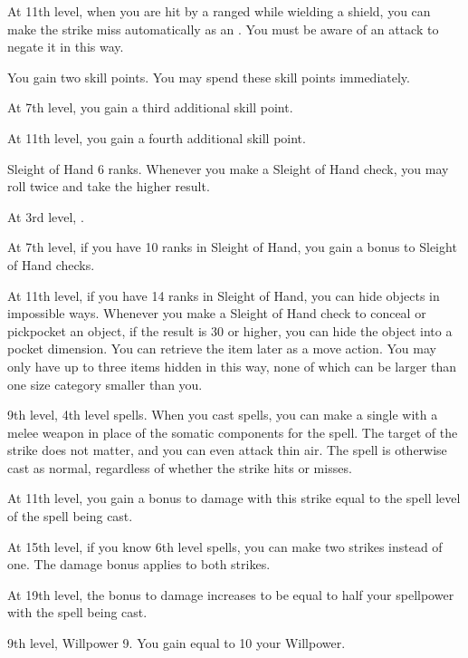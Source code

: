     At 11th level, when you are hit by a ranged  while wielding a shield, you can make the strike miss automatically as an .
    You must be aware of an attack to negate it in this way.

    \featben You gain two skill points.
    You may spend these skill points immediately.

    At 7th level, you gain a third additional skill point.

    At 11th level, you gain a fourth additional skill point.

    \featpre Sleight of Hand 6 ranks.
    \featben Whenever you make a Sleight of Hand check, you may roll twice and take the higher result.

    At 3rd level, \tdash.

    At 7th level, if you have 10 ranks in Sleight of Hand, you gain a  bonus to Sleight of Hand checks.

    At 11th level, if you have 14 ranks in Sleight of Hand, you can hide objects in impossible ways.
    Whenever you make a Sleight of Hand check to conceal or pickpocket an object, if the result is 30 or higher, you can hide the object into a pocket dimension.
    You can retrieve the item later as a move action.
    You may only have up to three items hidden in this way, none of which can be larger than one size category smaller than you.
    \magical

    \featpres 9th level, 4th level spells.
    \featben When you cast spells, you can make a single  with a melee weapon in place of the somatic components for the spell.
    The target of the strike does not matter, and you can even attack thin air.
    The spell is otherwise cast as normal, regardless of whether the strike hits or misses.

    At 11th level, you gain a bonus to damage with this strike equal to the spell level of the spell being cast.

    At 15th level, if you know 6th level spells, you can make two strikes instead of one.
    The damage bonus applies to both strikes.

    At 19th level, the bonus to damage increases to be equal to half your spellpower with the spell being cast.

    \featpres 9th level, Willpower 9.
    \featben You gain  equal to 10 \add your Willpower.

